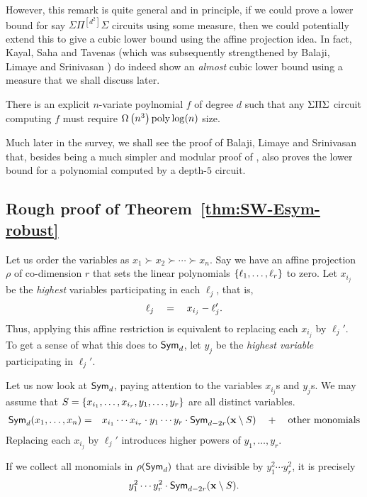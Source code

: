 However, this remark is quite general and in principle, if we could prove a lower bound for say $\Sigma\Pi^{[d^2]}\Sigma$ circuits using some measure, then we could potentially extend this to give a cubic lower bound using the affine projection idea.
In fact, Kayal, Saha and Tavenas \cite{kst16} (which was subsequently strengthened by Balaji, Limaye and Srinivasan \cite{BLS16}) do indeed show an \emph{almost} cubic lower bound using a measure that we shall discuss later.

\begin{theorem} There is an explicit $n$-variate poylnomial $f$ of degree $d$ such that any $\Sigma\Pi\Sigma$ circuit computing $f$ must require $\Omega\left(n^3\right){\operatorname{poly} \log(n)}$ size. 
\end{theorem}

Much later in the survey, we shall see the proof of Balaji, Limaye and Srinivasan \cite{BLS16} that, besides being a much simpler and modular proof of \cite{kst16}, also proves the lower bound for a polynomial computed by a depth-$5$ circuit.

\subsection{Rough proof of Theorem~\ref{thm:SW-Esym-robust}}

Let us order the variables as $x_1 \succ x_2 \succ \cdots \succ x_n$.
Say we have an affine projection $\rho$ of co-dimension $r$ that sets the linear polynomials $\left\{\ell_1,\dots, \ell_r\right\}$ to zero. Let $x_{i_j}$ be the \emph{highest} variables participating in each $\ell_j$, that is,
\[
  \ell_j \quad = \quad x_{i_j} - \ell_j'.
\]
Thus, applying this affine restriction is equivalent to replacing each $x_{i_j}$ by $\ell_{j}'$. To get a sense of what this does to $\operatorname{\mathsf{Sym}}_d$, let $y_j$ be the \emph{highest variable} participating in $\ell_j'$.

Let us now look at $\operatorname{\mathsf{Sym}}_d$, paying attention to the variables $x_{i_j}$s and $y_j$s. We may assume that  $S = \left\{x_{i_1},\ldots, x_{i_r}, y_1,\ldots, y_r\right\}$ are all distinct variables.
\begin{eqnarray*}
  \operatorname{\mathsf{Sym}}_d(x_1,\dots, x_n) & = &  x_{i_1}\cdots x_{i_r}\cdot y_1\cdots y_r \cdot \operatorname{\mathsf{Sym}}_{d - 2r}(\mathbf{x} \setminus S) \quad + \quad \text{other monomials}
\end{eqnarray*}
Replacing each $x_{i_j}$ by $\ell_j'$ introduces higher powers of $y_1,\ldots, y_r$.

\begin{claim}
  If we collect all monomials in $\rho(\operatorname{\mathsf{Sym}}_d)$ that are divisible by $y_1^2\cdots y_r^2$, it is precisely
  \[
    y_1^2 \cdots y_r^2 \cdot \operatorname{\mathsf{Sym}}_{d-2r}(\mathbf{x} \setminus S).
  \]
\end{claim}


